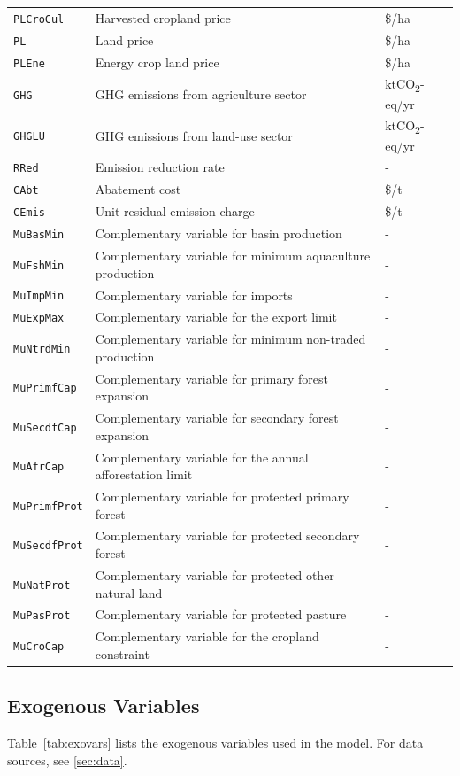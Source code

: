 \begin{xltabular}{\linewidth}{l X l}
  \texttt{PLCroCul} & Harvested cropland price & \$/ha \\
  \texttt{PL} & Land price & \$/ha \\
  \texttt{PLEne} & Energy crop land price & \$/ha \\
  \texttt{GHG} & GHG emissions from agriculture sector & ktCO\textsubscript{2}-eq/yr \\
  \texttt{GHGLU} & GHG emissions from land-use sector & ktCO\textsubscript{2}-eq/yr \\
  \texttt{RRed} & Emission reduction rate & - \\
  \texttt{CAbt} & Abatement cost & \$/t \\
  \texttt{CEmis} & Unit residual-emission charge & \$/t \\
  \texttt{MuBasMin} & Complementary variable for basin production & - \\
  \texttt{MuFshMin} & Complementary variable for minimum aquaculture production & - \\
  \texttt{MuImpMin} & Complementary variable for imports & - \\
  \texttt{MuExpMax} & Complementary variable for the export limit & - \\
  \texttt{MuNtrdMin} & Complementary variable for minimum non-traded production & - \\
  \texttt{MuPrimfCap} & Complementary variable for primary forest expansion & - \\
  \texttt{MuSecdfCap} & Complementary variable for secondary forest expansion & - \\
  \texttt{MuAfrCap} & Complementary variable for the annual afforestation limit & - \\
  \texttt{MuPrimfProt} & Complementary variable for protected primary forest & - \\
  \texttt{MuSecdfProt} & Complementary variable for protected secondary forest & - \\
  \texttt{MuNatProt} & Complementary variable for protected other natural land & - \\
  \texttt{MuPasProt} & Complementary variable for protected pasture & - \\
  \texttt{MuCroCap} & Complementary variable for the cropland constraint & - \\
\end{xltabular}


\subsection{Exogenous Variables}
Table~\ref{tab:exovars} lists the exogenous variables used in the model. For data sources, see \cref{sec:data}.

